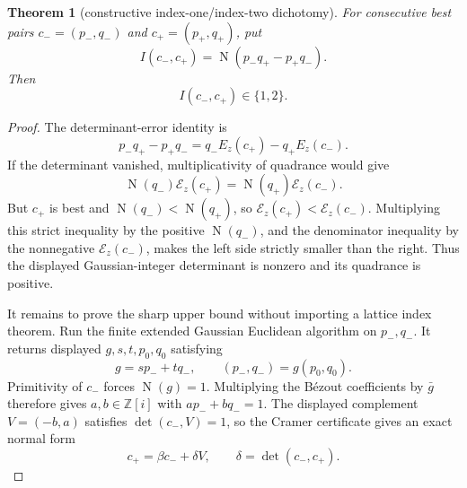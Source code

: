 \documentclass[11pt]{article}
\newtheorem{theorem}{Theorem}[section]
\newcommand{\Zi}{\mathbb{Z}[i]}
\newcommand{\Norm}[1]{\operatorname{N}\!\left(#1\right)}
\begin{document}
\begin{theorem}[constructive index-one/index-two dichotomy]
\label{lem:finite-coefficient-index}
For consecutive best pairs $c_-=(p_-,q_-)$ and $c_+=(p_+,q_+)$, put
\begin{equation}
\label{eq:coefficient-index-quadrance}
 I(c_-,c_+)=\Norm{p_-q_+-p_+q_-}.
\end{equation}
Then
\begin{equation}
\label{eq:coefficient-index-bound}
             I(c_-,c_+)\in\{1,2\}.
\end{equation}
\end{theorem}

\begin{proof}
The determinant-error identity is
\[
 p_-q_+-p_+q_-
   =q_-E_z(c_+)-q_+E_z(c_-).
\]
If the determinant vanished, multiplicativity of quadrance would give
\[
 \Norm{q_-}\mathcal E_z(c_+)
   =\Norm{q_+}\mathcal E_z(c_-).
\]
But $c_+$ is best and $\Norm{q_-}<\Norm{q_+}$, so
$\mathcal E_z(c_+)<\mathcal E_z(c_-)$.  Multiplying this strict inequality
by the positive $\Norm{q_-}$, and the denominator inequality by the
nonnegative $\mathcal E_z(c_-)$, makes the left side strictly smaller than
the right.  Thus the displayed Gaussian-integer determinant is nonzero and
its quadrance is positive.

It remains to prove the sharp upper bound without importing a lattice
index theorem.  Run the finite extended Gaussian Euclidean algorithm on
$p_-,q_-$.  It returns displayed $g,s,t,p_0,q_0$ satisfying
\[
       g=sp_-+tq_- ,\qquad (p_-,q_-)=g(p_0,q_0).
\]
Primitivity of $c_-$ forces $\Norm g=1$.  Multiplying the B\'ezout
coefficients by $\bar g$ therefore gives $a,b\in\Zi$ with
$ap_-+bq_-=1$.  The displayed complement $V=(-b,a)$ satisfies
$\det(c_-,V)=1$, so the Cramer certificate gives an exact normal form
\begin{equation}
\label{eq:index-basis-normal-form}
                    c_+=\beta c_-+\delta V,
       \qquad \delta=\det(c_-,c_+).
\end{equation}


\end{proof}
\end{document}
